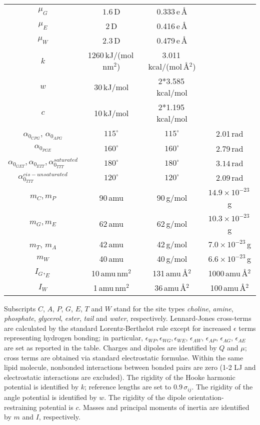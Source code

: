 \documentclass[10pt]{article}
\begin{document}
\begin{table*}[!ht]
\begin{tabular}{|c|c|c|c|}
 $\mu_G$ & $1.6$\,D & 0.333\,e\,\AA&\\
 $\mu_E$ & $2$\,D & 0.416\,e\,\AA&\\
 $\mu_W$ &$2.3$\,D & 0.479\,e\,\AA&\\
 $k$& 1260\,kJ/(mol\,nm$^{2}$)& 3.011\,kcal/(mol\,\AA$^2$)&\\
 $w$& 30\,kJ/mol& 2*3.585\,kcal/mol&\\
 $c$& 10\,kJ/mol& 2*1.195\,kcal/mol&\\
 $\alpha_{0_{CPG}}$, $\alpha_{0_{APG}}$ & $115^{\circ}$& $115^{\circ}$& 2.01\,rad\\
 $\alpha_{0_{PGE}}$ &  $160^{\circ}$&$160^{\circ}$&2.79\,rad\\
 $\alpha_{0_{GET}},\alpha_{0_{ETT}},\alpha_{0_{TTT}}^{saturated}$ & $180^{\circ}$& $180^{\circ}$&$3.14$\,rad\\
 $\alpha_{0_{TTT}}^{cis-unsaturated}$ & $120^{\circ}$ & $120^{\circ}$ &$2.09$\,rad\\
 $m_C, m_P$ &  90\,amu& 90\,g/mol& $14.9\times10^{-23}$\,g\\ 
 $m_G, m_E$ &  62\,amu& 62\,g/mol& $10.3\times10^{-23}$\,g\\ 
 $m_T$, $m_A$ &  42\,amu & 42\,g/mol & $7.0\times10^{-23}$\,g\\ 
 $m_W$ &  40\,amu &40\,g/mol & $6.6\times10^{-23}$\,g\\
 $I_G, _E$ &  10\,amu\,nm$^{2}$& 131\,amu\,\AA$^2$ & 1000\,amu\,\AA$^2$\\ 
 $I_W$ &  1\,amu\,nm$^{2}$& 36\,amu\,\AA$^2$ & 100\,amu\,\AA$^2$\\
\end{tabular}
\begin{flushleft}Subscripts $C$, $A$, $P$, $G$, $E$, $T$ and $W$ stand for the site types {\it choline}, {\it amine}, {\it phosphate}, {\it glycerol}, {\it ester}, {\it tail} and {\it water}, respectively. Lennard-Jones cross-terms are calculated by the standard Lorentz-Berthelot rule %
except for increased $\epsilon$ terms representing hydrogen bonding; in particular, $\epsilon_{WP},\epsilon_{WG}, \epsilon_{WE}$, $\epsilon_{AW}$, $\epsilon_{AP}$, $\epsilon_{AG}$, $\epsilon_{AE}$ are set as reported in the table. Charges and dipoles are identified by $Q$ and $\mu$; cross terms are obtained via standard electrostatic formulae. %
Within the same lipid molecule, nonbonded interactions between bonded pairs are zero (1-2 LJ and electrostatic interactions are excluded). 
The rigidity of the Hooke harmonic potential %
is identified by $k$;  reference lengths are set to $0.9\,\sigma_{ij}$. The rigidity of the angle potential %
is identified by $w$. The rigidity of the dipole orientation-restraining potential %
is $c$. Masses and principal moments of inertia are identified by $m$ and $I$, respectively. 
\end{flushleft}
\label{tab:lipidPars}
 \end{table*}





\end{document}
